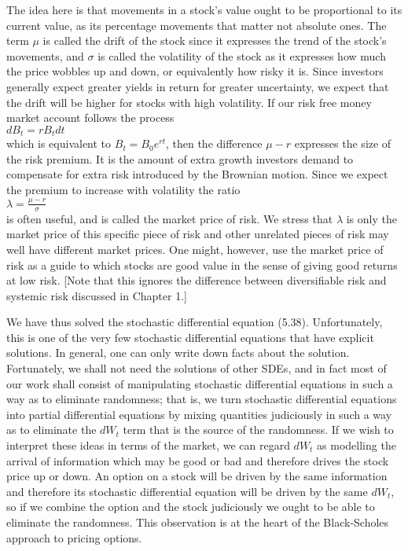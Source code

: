 The idea here is that movements in a stock's value ought to be proportional to its current value, as its percentage movements that matter not absolute ones. The term $\mu$ is called the drift of the stock since it expresses the trend of the stock's movements, and $\sigma$ is called the volatility of the stock as it expresses how much the price wobbles up and down, or equivalently how risky it is. Since investors generally expect greater yields in return for greater uncertainty, we expect that the drift will be higher for stocks with high volatility. If our risk free money market account follows the process \\
$dB_t = r B_t dt$ \\
which is equivalent to $B_t = B_0 e^{rt}$, then the difference $\mu - r$ expresses the size of the risk premium. It is the amount of extra growth investors demand to compensate for extra risk introduced by the Brownian motion. Since we expect the premium to increase with volatility the ratio \\
$\lambda = \frac{\mu - r}{\sigma}$ \\
is often useful, and is called the market price of risk. We stress that $\lambda$ is only the market price of this specific piece of risk and other unrelated pieces of risk may well have different market prices. One might, however, use the market price of risk as a guide to which stocks are good value in the sense of giving good returns at low risk. [Note that this ignores the difference between diversifiable risk and systemic risk discussed in Chapter 1.]

We have thus solved the stochastic differential equation (5.38). Unfortunately, this is one of the very few stochastic differential equations that have explicit solutions. In general, one can only write down facts about the solution. Fortunately, we shall not need the solutions of other SDEs, and in fact most of our work shall consist of manipulating stochastic differential equations in such a way as to eliminate randomness; that is, we turn stochastic differential equations into partial differential equations by mixing quantities judiciously in such a way as to eliminate the $d W_t$ term that is the source of the randomness. If we wish to interpret these ideas in terms of the market, we can regard $d W_t$ as modelling the arrival of information which may be good or bad and therefore drives the stock price up or down. An option on a stock will be driven by the same information and therefore its stochastic differential equation will be driven by the same $d W_t$, so if we combine the option and the stock judiciously we ought to be able to eliminate the randomness. This observation is at the heart of the Black-Scholes approach to pricing options.

